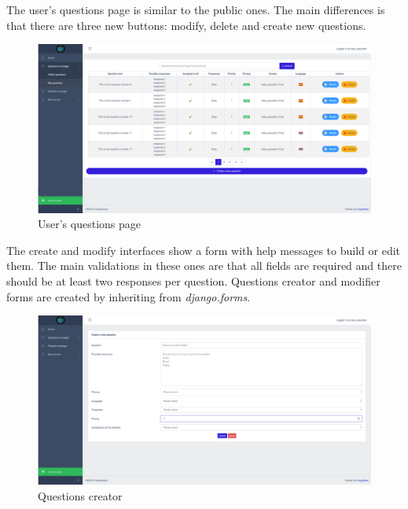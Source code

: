 \documentclass[12pt,english]{article}
\begin{document}
The user's questions page is similar to the public ones. The main differences is that there are three new buttons: modify, delete and create new questions.

\begin{figure}[H]
    \centering
    \includegraphics[width=\textwidth]{my_questions.png}
    \caption{User's questions page}
\end{figure}

The create and modify interfaces show a form with help messages to build or edit them. The main validations in these ones are that all fields are required and there should be at least two responses per question. Questions creator and modifier forms are created by inheriting from \emph{django.forms}.

\begin{figure}[H]
  \centering
    \includegraphics[width=\textwidth]{create_question.png}
  \caption{Questions creator}
\end{figure}
\end{document}
